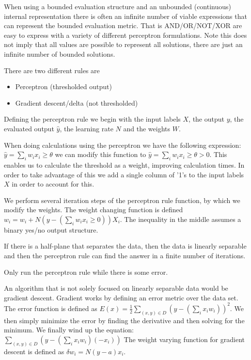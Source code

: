 \documentclass{article}
\begin{document}
When using a bounded evaluation structure and an unbounded (continuous) internal
representation there is often an infinite number of viable expressions that
can represent the bounded evaluation metric. That is AND/OR/NOT/XOR are easy
to express with a variety of different perceptron formulations. Note this does 
not imply that all values are possible to represent all solutions, there are
just an infinite number of bounded solutions. 

There are two different rules are
\begin{itemize}
	\item Perceptron (thresholded output)
	\item Gradient descent/delta (not thresholded)
\end{itemize} Defining the perceptron rule we begin with the input labels $X$, the output $y$, the evaluated output $\hat{y}$, the learning rate $N$ and the weights $W$.

When doing calculations using the perceptron we have the following expression:
$\hat{y} = \sum_i w_ix_i \geq \theta$ we can modify this function to
$\hat{y} = \sum_i w_ix_i \geq \theta > 0$. This enables us to calculate the 
threshold as a weight, improving calculation times. In order to take advantage 
of this we add a single column of '1's to the input labels $X$ in order to
account for this. 

We perform several iteration steps of the perceptron rule function, by which 
we modify the weights. The weight changing function is defined $w_i = w_i + N
(y - (\sum_i w_ix_i \geq 0))X_i$. The inequality in the middle assumes a binary
yes/no output structure. 

If there is a half-plane that separates the data, then the data is linearly
separable and then the perceptron rule can find the answer in a finite number
of iterations. 

Only run the perceptron rule while there is some error. 

An algorithm that is not solely focused on linearly separable data would be 
gradient descent. Gradient works by defining an error metric over the data set. 
The error function is defined as $E(x) = \frac{1}{2}\sum_{(x,y) \in D} (y - 
(\sum_i x_iw_i))^2$. We then simply minimize the error by finding the derivative
and then solving for the minimum. We finally wind up the equation:
$\sum_{(x,y)\in D}(y - (\sum_i x_iw_i)(-x_i))$ The weight varying function for 
gradient descent is defined as $\delta w_i = N(y - a)x_i$. 
\end{document}
